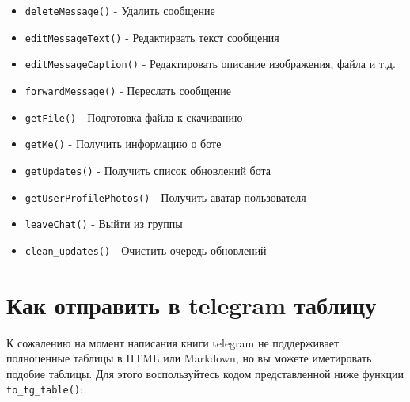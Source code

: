 \documentclass[
]{book}
\providecommand{\tightlist}{%
  \setlength{\itemsep}{0pt}\setlength{\parskip}{0pt}}
\begin{document}
\begin{itemize}
\tightlist
\item
  \texttt{deleteMessage()} - Удалить сообщение
\item
  \texttt{editMessageText()} - Редактирвать текст сообщения
\item
  \texttt{editMessageCaption()} - Редактировать описание изображения, файла и т.д.
\item
  \texttt{forwardMessage()} - Переслать сообщение
\item
  \texttt{getFile()} - Подготовка файла к скачиванию
\item
  \texttt{getMe()} - Получить информацию о боте
\item
  \texttt{getUpdates()} - Получить список обновлений бота
\item
  \texttt{getUserProfilePhotos()} - Получить аватар пользователя
\item
  \texttt{leaveChat()} - Выйти из группы
\item
  \texttt{clean\_updates()} - Очистить очередь обновлений
\end{itemize}

\section{Как отправить в telegram таблицу}\label{ux43aux430ux43a-ux43eux442ux43fux440ux430ux432ux438ux442ux44c-ux432-telegram-ux442ux430ux431ux43bux438ux446ux443}

К сожалению на момент написания книги telegram не поддерживает полноценные таблицы в HTML или Markdown, но вы можете иметировать подобие таблицы. Для этого воспользуйтесь кодом представленной ниже функции \texttt{to\_tg\_table()}:
\end{document}
